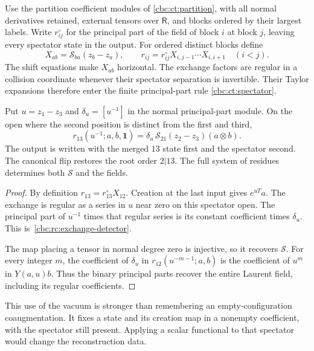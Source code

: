 Use the partition coefficient modules of
\eqref{cbc:ct:partition}, with all normal derivatives
retained, external tensors over $\mathsf R$, and blocks
ordered by their largest labels.
Write $r^\circ_{ij}$ for the principal part of
the field of block $i$ at block $j$, leaving every
spectator state in the output. For ordered distinct
blocks define
\begin{equation}\label{cbc:rc:exchanged-residue}
 X_{ab}=\mathcal S_{ba}(z_b-z_a),\qquad
 r_{ij}=r^\circ_{ij}X_{i,j-1}\cdots X_{i,i+1}
       \quad(i<j).
\end{equation}
The shift equations make $X_{ab}$ horizontal.
The exchange factors are regular in a collision
coordinate whenever their spectator separation
is invertible. Their Taylor expansions therefore
enter the finite principal-part rule
\eqref{cbc:ct:spectator}.

\begin{proposition}\label{cbc:rc:vacuum-exchange}
Put $u=z_1-z_3$ and $\delta_u=[u^{-1}]$ in
the normal principal-part module. On the open
where the second position is distinct from the
first and third,
\begin{equation}\label{cbc:rc:exchange-detector}
 r_{13}(u^{-1};a,b,\mathbf1)
   =\delta_u\,\mathcal S_{21}(z_2-z_3)(a\otimes b).
\end{equation}
The output is written with the merged $13$ state
first and the spectator second. The canonical
flip restores the root order $2|13$.
The full system of residues determines both
$\mathcal S$ and the fields.
\end{proposition}
\begin{proof}
By definition $r_{13}=r^\circ_{13}X_{12}$.
Creation at the last input gives $e^{uT}a$.
The exchange is regular as a series in $u$
near zero on this spectator open. The principal
part of $u^{-1}$ times that regular series is
its constant coefficient times $\delta_u$.
This is~\eqref{cbc:rc:exchange-detector}.

The map placing a tensor in normal degree zero
is injective, so it recovers $\mathcal S$.
For every integer $m$, the coefficient of
$\delta_u$ in $r_{12}(u^{-m-1};a,b)$ is the
coefficient of $u^m$ in $Y(a,u)b$.
Thus the binary principal parts recover the
entire Laurent field, including its regular
coefficients.
\end{proof}

This use of the vacuum is stronger than
remembering an empty-configuration coaugmentation.
It fixes a state and its creation map in a
nonempty coefficient, with the spectator still
present. Applying a scalar functional to that
spectator would change the reconstruction data.

